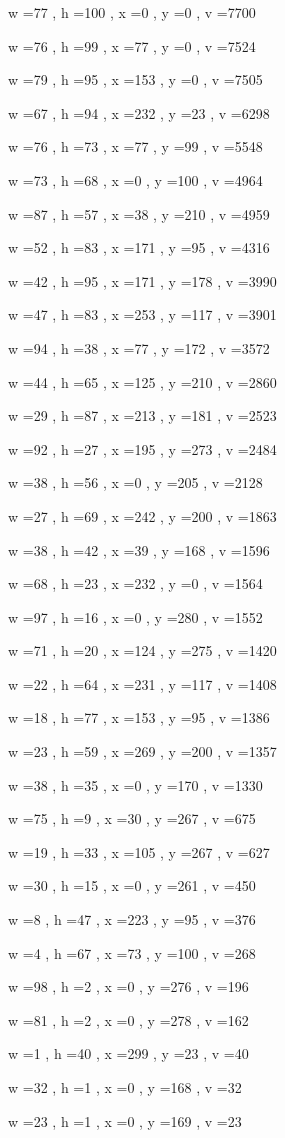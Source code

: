 \documentclass[11pt]{article}
\begin{document}
w =77 , h =100 , x =0 , y =0 , v =7700
\par
w =76 , h =99 , x =77 , y =0 , v =7524
\par
w =79 , h =95 , x =153 , y =0 , v =7505
\par
w =67 , h =94 , x =232 , y =23 , v =6298
\par
w =76 , h =73 , x =77 , y =99 , v =5548
\par
w =73 , h =68 , x =0 , y =100 , v =4964
\par
w =87 , h =57 , x =38 , y =210 , v =4959
\par
w =52 , h =83 , x =171 , y =95 , v =4316
\par
w =42 , h =95 , x =171 , y =178 , v =3990
\par
w =47 , h =83 , x =253 , y =117 , v =3901
\par
w =94 , h =38 , x =77 , y =172 , v =3572
\par
w =44 , h =65 , x =125 , y =210 , v =2860
\par
w =29 , h =87 , x =213 , y =181 , v =2523
\par
w =92 , h =27 , x =195 , y =273 , v =2484
\par
w =38 , h =56 , x =0 , y =205 , v =2128
\par
w =27 , h =69 , x =242 , y =200 , v =1863
\par
w =38 , h =42 , x =39 , y =168 , v =1596
\par
w =68 , h =23 , x =232 , y =0 , v =1564
\par
w =97 , h =16 , x =0 , y =280 , v =1552
\par
w =71 , h =20 , x =124 , y =275 , v =1420
\par
w =22 , h =64 , x =231 , y =117 , v =1408
\par
w =18 , h =77 , x =153 , y =95 , v =1386
\par
w =23 , h =59 , x =269 , y =200 , v =1357
\par
w =38 , h =35 , x =0 , y =170 , v =1330
\par
w =75 , h =9 , x =30 , y =267 , v =675
\par
w =19 , h =33 , x =105 , y =267 , v =627
\par
w =30 , h =15 , x =0 , y =261 , v =450
\par
w =8 , h =47 , x =223 , y =95 , v =376
\par
w =4 , h =67 , x =73 , y =100 , v =268
\par
w =98 , h =2 , x =0 , y =276 , v =196
\par
w =81 , h =2 , x =0 , y =278 , v =162
\par
w =1 , h =40 , x =299 , y =23 , v =40
\par
w =32 , h =1 , x =0 , y =168 , v =32
\par
w =23 , h =1 , x =0 , y =169 , v =23
\par
\newpage
\end{document}
